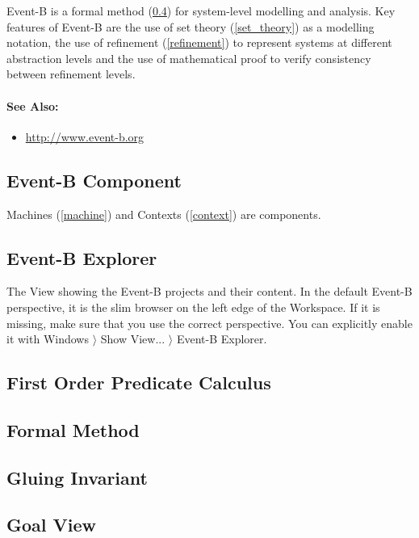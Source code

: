 Event-B is a formal method (\ref{formal_method}) for system-level modelling and analysis. Key features of Event-B are the use of set theory (\ref{set_theory}) as a modelling notation, the use of refinement (\ref{refinement}) to represent systems at different abstraction levels and the use of mathematical proof to verify consistency between refinement levels.

\paragraph{See Also:}
\begin{itemize}
\item \url{http://www.event-b.org}
\end{itemize}

\subsection{Event-B Component}
\label{eventb_component}

Machines (\ref{machine}) and Contexts (\ref{context}) are components.

\subsection{Event-B Explorer}
\label{eventb_explorer}

The View showing the Event-B projects and their content.  In the default Event-B perspective, it is the slim browser on the left edge of the Workspace.  If it is missing, make sure that you use the correct perspective.  You can explicitly enable it with \textsf{Windows $\rangle$ Show View... $\rangle$ Event-B Explorer}.

\subsection{First Order Predicate Calculus}
\label{first_order_predicate_calculus}


\subsection{Formal Method}
\label{formal_method}

\subsection{Gluing Invariant}
\label{gluing_invariant}

\subsection{Goal View}
\label{goal_view}

